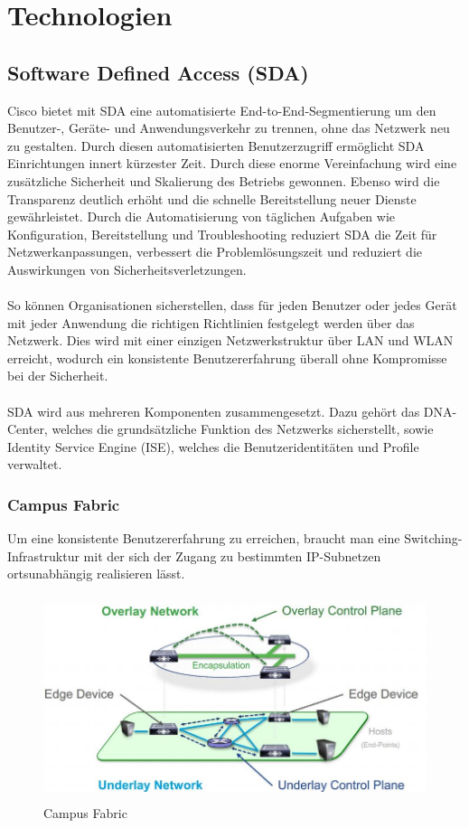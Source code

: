 \section{Technologien}

\subsection{Software Defined Access (SDA)}
Cisco bietet mit SDA eine automatisierte End-to-End-Segmentierung um den Benutzer-, Geräte- und Anwendungsverkehr zu trennen, ohne das Netzwerk neu zu gestalten. Durch diesen automatisierten Benutzerzugriff ermöglicht SDA Einrichtungen innert kürzester Zeit. Durch diese enorme Vereinfachung wird eine zusätzliche Sicherheit und Skalierung des Betriebs gewonnen. Ebenso wird die Transparenz deutlich erhöht und die schnelle Bereitstellung neuer Dienste gewährleistet. Durch die Automatisierung von täglichen Aufgaben wie Konfiguration, Bereitstellung und Troubleshooting reduziert SDA die Zeit für Netzwerkanpassungen, verbessert die Problemlösungszeit und reduziert die Auswirkungen von Sicherheitsverletzungen.\\
\\
So können Organisationen sicherstellen, dass für jeden Benutzer oder jedes Gerät mit jeder Anwendung die richtigen Richtlinien festgelegt werden über das Netzwerk. Dies wird mit einer einzigen Netzwerkstruktur über LAN und WLAN erreicht, wodurch ein konsistente Benutzererfahrung überall ohne Kompromisse bei der Sicherheit. \\
\\
SDA wird aus mehreren Komponenten zusammengesetzt. Dazu gehört das DNA-Center, welches die grundsätzliche Funktion des Netzwerks sicherstellt, sowie Identity Service Engine (ISE), welches die Benutzeridentitäten und Profile verwaltet. \cite{sda-definition}

\subsubsection{Campus Fabric}
Um eine konsistente Benutzererfahrung zu erreichen, braucht man eine Switching-Infrastruktur mit der sich der Zugang zu bestimmten IP-Subnetzen ortsunabhängig realisieren lässt. \cite{campusfabric-introduction} \\

\begin{figure}[H]
	\centering
	\includegraphics[height=6cm]{img/campusfabric.jpg}
	\caption{Campus Fabric}
	\label{fig:Campus Fabric}
\end{figure}

